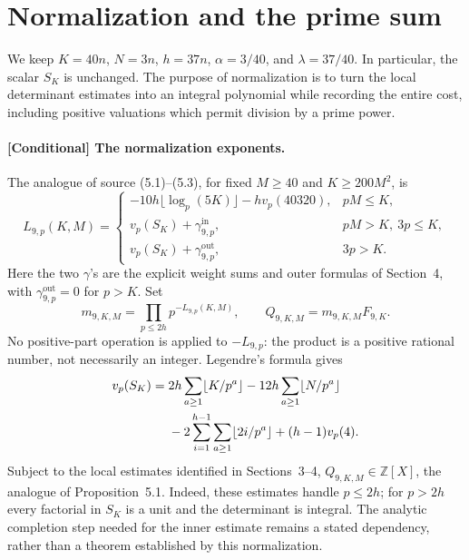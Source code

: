 \section{Normalization and the prime sum}
\label{s5-normalization}

We keep $K=40n$, $N=3n$, $h=37n$, $\alpha=3/40$, and
$\lambda=37/40$.  In particular, the scalar $S_K$ is unchanged.
The purpose of normalization is to turn the local determinant estimates
into an integral polynomial while recording the entire cost, including
positive valuations which permit division by a prime power.

\paragraph{[Conditional] The normalization exponents.}
The analogue of source (5.1)--(5.3), for fixed $M\geq40$ and
$K\geq200M^2$, is
\begin{equation}
 L_{9,p}(K,M)=
 \begin{cases}
 -10h\lfloor\log_p(5K)\rfloor-hv_p(40320),&pM\leq K,\\
 v_p(S_K)+\gamma^{\mathrm{in}}_{9,p},&pM>K,\ 3p\leq K,\\
 v_p(S_K)+\gamma^{\mathrm{out}}_{9,p},&3p>K.
 \end{cases}
 \label{s5-local-exponents}
\end{equation}
Here the two $\gamma$'s are the explicit weight sums and outer formulas
of Section~4, with $\gamma^{\mathrm{out}}_{9,p}=0$ for $p>K$.  Set
\begin{equation}
 m_{9,K,M}=\prod_{p\leq2h}p^{-L_{9,p}(K,M)},\qquad
 Q_{9,K,M}=m_{9,K,M}F_{9,K}.
 \label{s5-normalizing-product}
\end{equation}
No positive-part operation is applied to $-L_{9,p}$: the product is a
positive rational number, not necessarily an integer.  Legendre's formula gives
\begin{align}
 v_p(S_K)={}&2h\sum_{a\geq1}\lfloor K/p^a\rfloor
 -12h\sum_{a\geq1}\lfloor N/p^a\rfloor\notag\\
 &-2\sum_{i=1}^{h-1}\sum_{a\geq1}\lfloor2i/p^a\rfloor
 +(h-1)v_p(4).
 \label{s5-legendre}
\end{align}
Subject to the local estimates identified in Sections~3--4,
$Q_{9,K,M}\in\mathbb Z[X]$, the analogue of Proposition~5.1.
Indeed, these estimates handle $p\leq2h$; for $p>2h$ every factorial
in $S_K$ is a unit and the determinant is integral.  The analytic
completion step needed for the inner estimate remains a stated
dependency, rather than a theorem established by this normalization.


